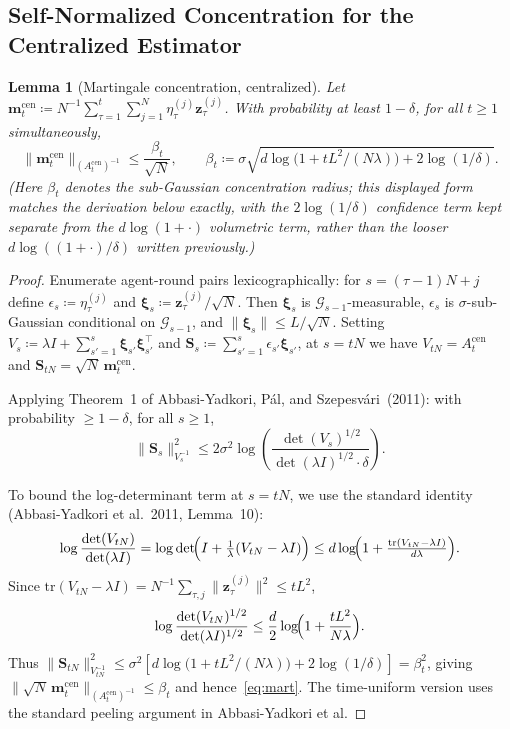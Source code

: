 \documentclass[11pt]{article}
\newtheorem{lemma}[theorem]{Lemma}
\begin{document}
\subsection{Self-Normalized Concentration for the Centralized Estimator}

\begin{lemma}[Martingale concentration, centralized]\label{lem:mart}
Let $\bm{m}_t^{\mathrm{cen}}\coloneqq
N^{-1}\sum_{\tau=1}^t\sum_{j=1}^N\eta_\tau^{(j)}\bm{z}_\tau^{(j)}$.
With probability at least $1-\delta$, for all $t\geq 1$
simultaneously,
\begin{equation}
\|\bm{m}_t^{\mathrm{cen}}\|_{(A_t^{\mathrm{cen}})^{-1}}
\leq\frac{\beta_t}{\sqrt{N}},
\qquad
\beta_t\coloneqq\sigma\sqrt{d\log\!\bigl(1+tL^2/(N\lambda)\bigr)+2\log(1/\delta)}.
\label{eq:mart}
\end{equation}
(Here $\beta_t$ denotes the sub-Gaussian concentration radius; this
displayed form matches the derivation below exactly, with the
$2\log(1/\delta)$ confidence term kept separate from the
$d\log(1+\cdot)$ volumetric term, rather than the looser
$d\log((1+\cdot)/\delta)$ written previously.)
\end{lemma}

\begin{proof}
Enumerate agent-round pairs lexicographically:
for $s=(\tau-1)N+j$ define
$\epsilon_s\coloneqq\eta_\tau^{(j)}$
and $\bm{\xi}_s\coloneqq\bm{z}_\tau^{(j)}/\sqrt{N}$.
Then $\bm{\xi}_s$ is $\mathcal{G}_{s-1}$-measurable,
$\epsilon_s$ is $\sigma$-sub-Gaussian conditional on $\mathcal{G}_{s-1}$,
and $\|\bm{\xi}_s\|\leq L/\sqrt{N}$.
Setting $V_s\coloneqq\lambda I+\sum_{s'=1}^s\bm{\xi}_{s'}\bm{\xi}_{s'}^\top$
and $\bm{S}_s\coloneqq\sum_{s'=1}^s\epsilon_{s'}\bm{\xi}_{s'}$,
at $s=tN$ we have $V_{tN}=A_t^{\mathrm{cen}}$ and
$\bm{S}_{tN}=\sqrt{N}\,\bm{m}_t^{\mathrm{cen}}$.

Applying Theorem~1 of Abbasi-Yadkori, P\'al, and Szepesv\'ari~(2011):
with probability $\geq 1-\delta$, for all $s\geq 1$,
\[
\|\bm{S}_s\|_{V_s^{-1}}^2
\leq 2\sigma^2\log\!\left(\frac{\det(V_s)^{1/2}}
{\det(\lambda I)^{1/2}\cdot\delta}\right).
\]

To bound the log-determinant term at $s=tN$, we use the standard
identity (Abbasi-Yadkori et al.\ 2011, Lemma~10):
\[
\log\frac{\det(V_{tN})}{\det(\lambda I)}
=\log\det\!\Bigl(I+\tfrac{1}{\lambda}(V_{tN}-\lambda I)\Bigr)
\leq d\log\!\Bigl(1+\tfrac{\mathrm{tr}(V_{tN}-\lambda I)}{d\lambda}\Bigr).
\]
Since $\mathrm{tr}(V_{tN}-\lambda I)=N^{-1}\sum_{\tau,j}\|\bm{z}_\tau^{(j)}\|^2\leq tL^2$,
\[
\log\frac{\det(V_{tN})^{1/2}}{\det(\lambda I)^{1/2}}
\leq\frac{d}{2}\log\!\Bigl(1+\frac{tL^2}{N\lambda}\Bigr).
\]
Thus $\|\bm{S}_{tN}\|_{V_{tN}^{-1}}^2\leq
\sigma^2\!\left[d\log\!\bigl(1+tL^2/(N\lambda)\bigr)+2\log(1/\delta)\right]
=\beta_t^2$,
giving $\|\sqrt{N}\,\bm{m}_t^{\mathrm{cen}}\|_{(A_t^{\mathrm{cen}})^{-1}}\leq\beta_t$
and hence~\eqref{eq:mart}.
The time-uniform version uses the standard peeling argument in
Abbasi-Yadkori et al.
\end{proof}
\end{document}
